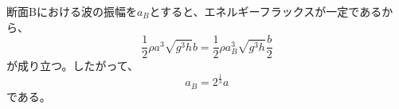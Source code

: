 \documentclass[a4paper]{jsarticle}
\begin{document}
\subsubsection{}
断面Bにおける波の振幅を$a_B$とすると、エネルギーフラックスが一定であるから、
\begin{equation}
  \frac{1}{2} \rho a^3 \sqrt{g^3 h} b
  = \frac{1}{2} \rho a_B^3 \sqrt{g^3 h} \frac{b}{2}
\end{equation}
が成り立つ。したがって、
\begin{equation}
  a_B = 2^{\frac{1}{3}} a
\end{equation}
である。
\end{document}
